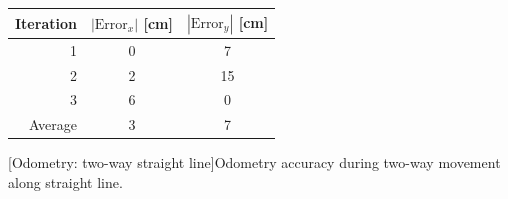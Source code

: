 \documentclass[11pt]{article}
\begin{document}
            \begin{center}
              \begin{tabular}{r|cc}
                Iteration & $|\text{Error}_x|$ [cm] & $|\text{Error}_y|$ [cm] \\ \hline
                1 & 0 & 7 \\
                2 & 2 & 15 \\
                3 & 6 & 0 \\ \hline
                Average & 3 & 7
              \end{tabular}\par
              [Odometry: two-way straight line]{Odometry
                accuracy during two-way movement along straight
                line.\label{tab:singleturn}}\par

            \end{center}

\newpage

\end{document}
